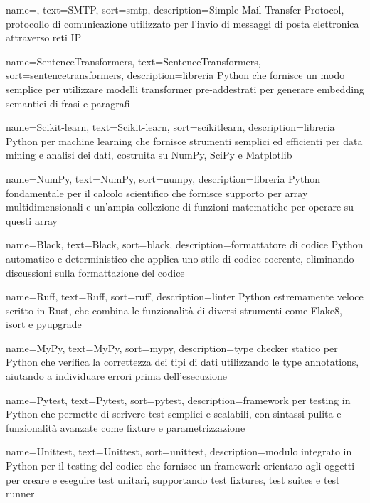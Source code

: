  {
    name=,
    text=SMTP,
    sort=smtp,
    description={Simple Mail Transfer Protocol, protocollo di comunicazione utilizzato per l'invio di messaggi di posta elettronica attraverso reti IP}
}

 {
    name=SentenceTransformers,
    text=SentenceTransformers,
    sort=sentencetransformers,
    description={libreria Python che fornisce un modo semplice per utilizzare modelli transformer pre-addestrati per generare embedding semantici di frasi e paragrafi}
}

 {
    name=Scikit-learn,
    text=Scikit-learn,
    sort=scikitlearn,
    description={libreria Python per machine learning che fornisce strumenti semplici ed efficienti per data mining e analisi dei dati, costruita su NumPy, SciPy e Matplotlib}
}

 {
    name=NumPy,
    text=NumPy,
    sort=numpy,
    description={libreria Python fondamentale per il calcolo scientifico che fornisce supporto per array multidimensionali e un'ampia collezione di funzioni matematiche per operare su questi array}
}

 {
    name=Black,
    text=Black,
    sort=black,
    description={formattatore di codice Python automatico e deterministico che applica uno stile di codice coerente, eliminando discussioni sulla formattazione del codice}
}

 {
    name=Ruff,
    text=Ruff,
    sort=ruff,
    description={linter Python estremamente veloce scritto in Rust, che combina le funzionalità di diversi strumenti come Flake8, isort e pyupgrade}
}

 {
    name=MyPy,
    text=MyPy,
    sort=mypy,
    description={type checker statico per Python che verifica la correttezza dei tipi di dati utilizzando le type annotations, aiutando a individuare errori prima dell'esecuzione}
}

 {
    name=Pytest,
    text=Pytest,
    sort=pytest,
    description={framework per testing in Python che permette di scrivere test semplici e scalabili, con sintassi pulita e funzionalità avanzate come fixture e parametrizzazione}
}

 {
    name=Unittest,
    text=Unittest,
    sort=unittest,
    description={modulo integrato in Python per il testing del codice che fornisce un framework orientato agli oggetti per creare e eseguire test unitari, supportando test fixtures, test suites e test runner}
}

